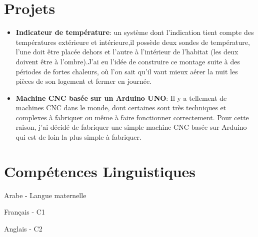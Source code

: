 \documentclass[a4paper,20pt]{article}
\newcommand{\resumeItem}[2]{
  \item\small{
    \textbf{#1}{: #2 \vspace{-2pt}}
  }
}
\newcommand{\resumeSubItem}[2]{\resumeItem{#1}{#2}\vspace{-3pt}}
\newcommand{\resumeSubHeadingListStart}{\begin{itemize}[leftmargin=*]}
\newcommand{\resumeSubHeadingListEnd}{\end{itemize}}
\begin{document}
\section{Projets}
\resumeSubHeadingListStart
\resumeSubItem{Indicateur de température}{un système dont l'indication tient compte des températures extérieure et intérieure,il possède deux sondes de
température, l'une doit être placée dehors et l'autre à l'intérieur de l'habitat (les deux doivent être à l'ombre).J'ai eu l'idée de construire ce montage suite à des périodes de fortes chaleurs, où l'on sait qu'il vaut mieux aérer la
nuit les pièces de son logement et fermer en journée.}
\vspace{2pt}
\resumeSubItem{Machine CNC basée sur un Arduino UNO}{Il y a tellement de machines CNC dans le monde, dont certaines sont très techniques et complexes à fabriquer ou
même à faire fonctionner correctement. Pour cette raison, j'ai décidé de fabriquer une simple machine CNC basée sur Arduino qui est de loin la plus simple à fabriquer.}
\vspace{2pt}
\resumeSubHeadingListEnd
\vspace{-5pt}
\section{Compétences Linguistiques}
\begin{description}[font=$\bullet$]
\item {Arabe - Langue maternelle}
\vspace{-5pt}
\item {Français - C1}
\vspace{-5pt}
\item {Anglais - C2}
\end{description}
\end{document}

